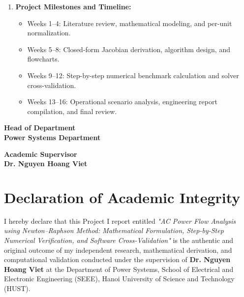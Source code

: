 \documentclass[12pt,a4paper,oneside]{report}
\begin{document}
\begin{enumerate}
\begin{itemize}
        \item Investigate grid physical behavior across four core operational test scenarios: system load scaling (80\% to 120\%), generator terminal voltage regulation, shunt capacitive compensation, and transmission line $N-1$ outage contingencies.
    \end{itemize}
    \item \textbf{Project Milestones and Timeline:}
    \begin{itemize}
        \item Weeks 1--4: Literature review, mathematical modeling, and per-unit normalization.
        \item Weeks 5--8: Closed-form Jacobian derivation, algorithm design, and flowcharts.
        \item Weeks 9--12: Step-by-step numerical benchmark calculation and solver cross-validation.
        \item Weeks 13--16: Operational scenario analysis, engineering report compilation, and final review.
    \end{itemize}
\end{enumerate}

\vspace{35pt}
\noindent
\begin{minipage}[t]{0.45\textwidth}
    \centering
    \textbf{Head of Department}\\[50pt]
    \textbf{Power Systems Department}
\end{minipage}
\hfill
\begin{minipage}[t]{0.45\textwidth}
    \centering
    \textbf{Academic Supervisor}\\[50pt]
    \textbf{Dr. Nguyen Hoang Viet}
\end{minipage}

\clearpage

\chapter*{Declaration of Academic Integrity}

I hereby declare that this Project I report entitled \textit{"AC Power Flow Analysis using Newton--Raphson Method: Mathematical Formulation, Step-by-Step Numerical Verification, and Software Cross-Validation"} is the authentic and original outcome of my independent research, mathematical derivation, and computational validation conducted under the supervision of \textbf{Dr. Nguyen Hoang Viet} at the Department of Power Systems, School of Electrical and Electronic Engineering (SEEE), Hanoi University of Science and Technology (HUST).
\end{document}
